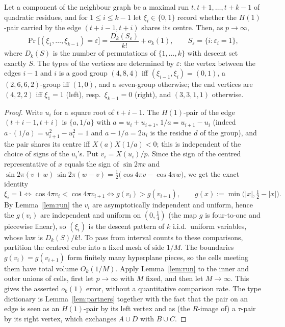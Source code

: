 \begin{proposition}\label{prop:descent}
Let a component of the neighbour graph be a maximal run $t,t+1,\dots,t+k-1$ of quadratic residues, and for $1\le i\le k-1$ let
$\xi_i\in\{0,1\}$ record whether the $H(1)$-pair carried by the edge $(t+i-1,t+i)$ shares its centre.  Then, as $p\to\infty$,
\[
 \Pr\bigl[(\xi_1,\dots,\xi_{k-1})=\varepsilon\bigr]=\frac{D_k(S_\varepsilon)}{k!}+o_k(1),\qquad
 S_\varepsilon=\{i:\varepsilon_i=1\},
\]
where $D_k(S)$ is the number of permutations of $\{1,\dots,k\}$ with descent set exactly $S$.  The types of the vertices are determined by
$\varepsilon$: the vertex between the edges $i-1$ and $i$ is a good group $(4,8,4)$ iff $(\xi_{i-1},\xi_i)=(0,1)$, a $(2,6,6,2)$-group iff
$(1,0)$, and a seven-group otherwise; the end vertices are $(4,2,2)$ iff $\xi_1=1$ (left), resp.\ $\xi_{k-1}=0$ (right), and $(3,3,1,1)$ otherwise.
\end{proposition}
\begin{proof}
Write $u_i$ for a square root of $t+i-1$.  The $H(1)$-pair of the edge $(t+i-1,t+i)$ is $\{a,1/a\}$ with
$a=u_i+u_{i+1}$, $1/a=u_{i+1}-u_i$ (indeed $a\cdot(1/a)=u_{i+1}^2-u_i^2=1$ and $a-1/a=2u_i$ is the residue $d$ of the group), and the pair
shares its centre iff $X(a)X(1/a)<0$; this is independent of the choice of signs of the $u_i$'s.  Put $v_i=X(u_i)/p$.  Since the sign of the
centred representative of $x$ equals the sign of $\sin2\pi x$ and
$\sin2\pi(v+w)\,\sin2\pi(w-v)=\tfrac12\bigl(\cos4\pi v-\cos4\pi w\bigr)$, we get the exact identity
\[
 \xi_i=1\iff\cos4\pi v_i<\cos4\pi v_{i+1}\iff g(v_i)>g(v_{i+1}),\qquad g(x):=\min\bigl(|x|,\tfrac12-|x|\bigr).
\]
By Lemma~\ref{lem:run} the $v_i$ are asymptotically independent and uniform, hence the $g(v_i)$ are independent and uniform on $(0,\frac14)$
(the map $g$ is four-to-one and piecewise linear), so $(\xi_i)$ is the descent pattern of $k$ i.i.d.\ uniform variables, whose law is
$D_k(S)/k!$.  To pass from interval counts to these comparisons, partition the centred cube into a fixed mesh of side $1/M$.
The boundaries $g(v_i)=g(v_{i+1})$ form finitely many hyperplane pieces, so the cells meeting them have total volume $O_k(1/M)$.
Apply Lemma~\ref{lem:run} to the inner and outer unions of cells, first let $p\to\infty$ with $M$ fixed, and then let $M\to\infty$.
This gives the asserted $o_k(1)$ error, without a quantitative comparison rate.  The type dictionary is Lemma~\ref{lem:partners} together with the fact that the pair on an edge is seen as an
$H(1)$-pair by its left vertex and as (the $R$-image of) a $\tau$-pair by its right vertex, which exchanges $A\cup D$ with $B\cup C$.
\end{proof}

